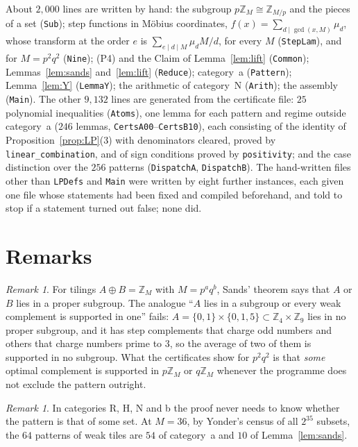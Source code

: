 \documentclass[11pt,a4paper]{amsart}
\theoremstyle{definition}
\theoremstyle{remark}
\newtheorem{remark}[theorem]{Remark}
\newcommand{\Z}{\mathbb{Z}}
\newcommand{\lean}[1]{\texttt{#1}}
\begin{document}
About $2{,}000$ lines are written by hand: the subgroup $p\Z_M\cong\Z_{M/p}$ and the pieces of a set
(\lean{Sub}); step functions in M\"obius coordinates, $f(x)=\sum_{d\mid\gcd(x,M)}\mu_d$, whose transform at the
order $e$ is $\sum_{e\mid d\mid M}\mu_dM/d$, for every $M$ (\lean{StepLam}), and for $M=p^2q^2$ (\lean{Nine});
(P4) and the Claim of Lemma~\ref{lem:lift} (\lean{Common}); Lemmas~\ref{lem:sands} and~\ref{lem:lift}
(\lean{Reduce}); category~a (\lean{Pattern}); Lemma~\ref{lem:Y} (\lean{LemmaY}); the arithmetic of category~N
(\lean{Arith}); the assembly (\lean{Main}). The other $9{,}132$ lines are generated from the certificate file:
$25$ polynomial inequalities (\lean{Atoms}), one lemma for each pattern and regime outside category~a ($246$ lemmas,
\lean{CertsA00}--\lean{CertsB10}), each consisting of the identity of Proposition~\ref{prop:LP}(3) with
denominators cleared, proved by \lean{linear\_combination}, and of sign conditions proved by \lean{positivity};
and the case distinction over the $256$ patterns (\lean{DispatchA}, \lean{DispatchB}). The hand-written files
other than \lean{LPDefs} and \lean{Main} were written by eight further instances, each given one file whose
statements had been fixed and compiled beforehand, and told to stop if a statement turned out false; none did.

\section{Remarks}

\begin{remark}\label{rem:sands}
For tilings $A\oplus B=\Z_M$ with $M=p^aq^b$, Sands' theorem says that $A$ or $B$ lies in a proper subgroup. The
analogue ``$A$ lies in a subgroup or every weak complement is supported in one'' fails: $A=\{0,1\}\times\{0,1,5\}
\subset\Z_4\times\Z_9$ lies in no proper subgroup, and it has step complements that charge odd numbers and
others that charge numbers prime to $3$, so the average of two of them is supported in no subgroup. What the
certificates show for $p^2q^2$ is that \emph{some} optimal complement is supported in $p\Z_M$ or $q\Z_M$ whenever
the programme does not exclude the pattern outright.
\end{remark}

\begin{remark}
In categories R, H, N and b the proof never needs to know whether the pattern is that of some set. At $M=36$,
by Yonder's census of all $2^{35}$ subsets, the $64$ patterns of weak tiles are $54$ of category~a and $10$ of
Lemma~\ref{lem:sands}.
\end{remark}
\end{document}
